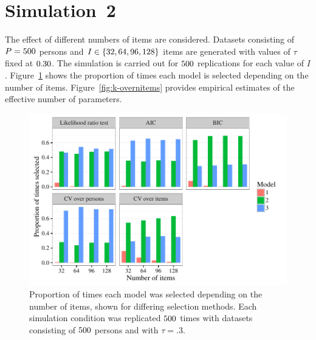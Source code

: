 \documentclass[12pt, letterpaper]{article}
\begin{document}
%


\section{Simulation~2}

The effect of different numbers of items are considered.
Datasets consisting of $P = 500$ persons and $I \in \{32, 64, 96, {} 128\}$ items are generated with values of $\tau$ fixed at $0.30$. The simulation is carried out for $500$ replications for each value of $I$.
Figure~\ref{fig:select-overnitems} shows the proportion of times each model is selected depending on the number of items. Figure~\ref{fig:k-overnitems} provides empirical estimates of the effective number of parameters.

\begin{figure}[tbp]
	\centering
	\includegraphics{chapter_2/figs/select_overnitems.pdf}
	\caption{Proportion of times each model was selected depending on the number of items, shown for differing selection methods. Each simulation condition was replicated $500$ times with datasets consisting of $500$ persons and with $\tau = .3$.}
	\label{fig:select-overnitems}
\end{figure}
\end{document}
